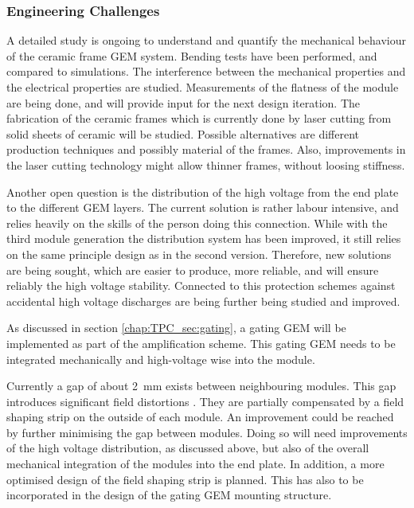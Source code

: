\subsubsection{Engineering Challenges}
A detailed study is ongoing to understand and quantify the mechanical behaviour of the ceramic frame GEM system. Bending tests have been performed, and compared to simulations. The interference between the mechanical properties and the electrical properties are studied. Measurements of the flatness of the module are being done, and will provide input for the next design iteration.
The fabrication of the ceramic frames which is currently done by laser cutting from solid sheets of ceramic will be studied. Possible alternatives are different production techniques and possibly material of the frames. Also, improvements in the laser cutting technology might allow thinner frames, without loosing stiffness.

Another open question is the distribution of the high voltage from the end plate to the different GEM layers. 
The current solution is rather labour intensive, and relies heavily on the skills of the person doing this connection. 
While with the third module generation the distribution system has been improved, it still relies on the same principle design as in the second version. 
Therefore, new solutions are being sought, which are easier to produce, more reliable, and will ensure reliably the high voltage stability. 
Connected to this protection schemes against accidental high voltage discharges are being further being studied and improved.

As discussed in section \ref{chap:TPC_sec:gating}, a gating GEM will be implemented as part of the amplification scheme. This gating GEM needs to be integrated mechanically and high-voltage wise into the module.

Currently a gap of about \SI{2}{mm} exists between neighbouring modules. This gap introduces significant field distortions \cite{Zenker:2014qra}. They are partially compensated by a field shaping strip on the outside of each module. 
An improvement could be reached by further minimising the gap between modules. Doing so will need improvements of the high voltage distribution, as discussed above, but also of the overall mechanical integration of the modules into the end plate. In addition, a more optimised design of the field shaping strip is planned. This has also to be incorporated in the design of the gating GEM mounting structure.

